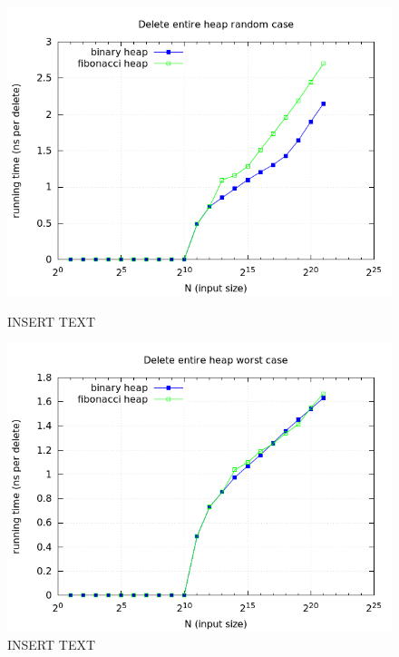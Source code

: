 \documentclass[a4paper,oneside,article,11pt]{memoir}
\begin{document}
\begin{figure}[H]
\centering
\begin{minipage}{0.48\columnwidth}
  \centering
  \includegraphics[width=\linewidth]{../res/delmin/delmin_del_all_time_random.png}%
  \caption{INSERT TEXT}
  \label{fig:delmin_all_random_time}
\end{minipage}%
\hfill
\begin{minipage}{0.48\columnwidth}
  \centering
  \includegraphics[width=\linewidth]{../res/delmin/delmin_del_all_time_worst.png}%
  \caption{INSERT TEXT}
  \label{fig:delmin_all_worst_time}
\end{minipage}
\end{figure}
\end{document}
